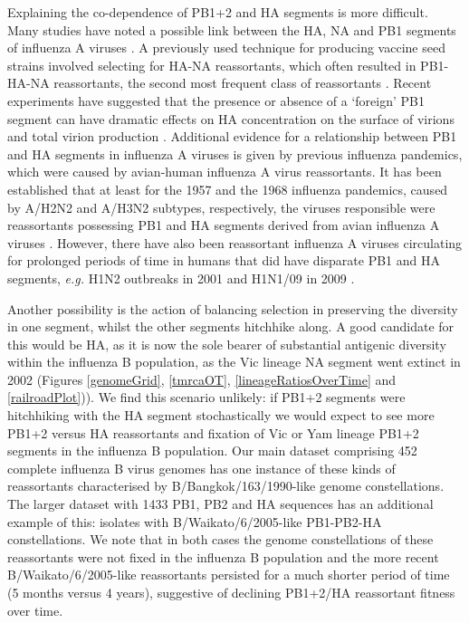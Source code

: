 \documentclass[11pt,oneside,letterpaper]{article}
\begin{document}
Explaining the co-dependence of PB1+2 and HA segments is more difficult.
Many studies have noted a possible link between the HA, NA and PB1 segments of influenza A viruses \citep{bergeron2010,fulvini2011}.
A previously used technique for producing vaccine seed strains involved selecting for HA-NA reassortants, which often resulted in PB1-HA-NA reassortants, the second most frequent class of reassortants \citep{bergeron2010,fulvini2011}.
Recent experiments have suggested that the presence or absence of a `foreign' PB1 segment can have dramatic effects on HA concentration on the surface of virions and total virion production \citep{cobbin2013}.
Additional evidence for a relationship between PB1 and HA segments in influenza A viruses is given by previous influenza pandemics, which were caused by avian-human influenza A virus reassortants.
It has been established that at least for the 1957 and the 1968 influenza pandemics, caused by A/H2N2 and A/H3N2 subtypes, respectively, the viruses responsible were reassortants possessing PB1 and HA segments derived from avian influenza A viruses \citep{kawaoka1989}.
However, there have also been reassortant influenza A viruses circulating for prolonged periods of time in humans that did have disparate PB1 and HA segments, \textit{e.g.} H1N2 outbreaks in 2001 \citep{gregory2002} and H1N1/09 in 2009 \citep{smith2009}.

Another possibility is the action of balancing selection in preserving the diversity in one segment, whilst the other segments hitchhike along.
A good candidate for this would be HA, as it is now the sole bearer of substantial antigenic diversity within the influenza B population, as the Vic lineage NA segment went extinct in 2002 (Figures \ref{genomeGrid}, \ref{tmrcaOT}, \ref{lineageRatiosOverTime} and \ref{railroadPlot})).
We find this scenario unlikely: if PB1+2 segments were hitchhiking with the HA segment stochastically we would expect to see more PB1+2 versus HA reassortants and fixation of Vic or Yam lineage PB1+2 segments in the influenza B population.
Our main dataset comprising 452 complete influenza B virus genomes has one instance of these kinds of reassortants characterised by B/Bangkok/163/1990-like genome constellations.
The larger dataset with 1433 PB1, PB2 and HA sequences has an additional example of this: isolates with B/Waikato/6/2005-like PB1-PB2-HA constellations.
We note that in both cases the genome constellations of these reassortants were not fixed in the influenza B population and the more recent B/Waikato/6/2005-like reassortants persisted for a much shorter period of time (5 months versus 4 years), suggestive of declining PB1+2/HA reassortant fitness over time.
\end{document}
